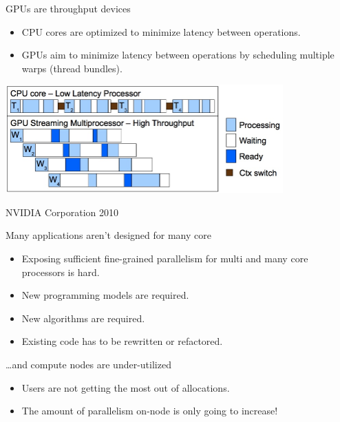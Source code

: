 \documentclass[aspectratio=43]{beamer}
\begin{document}
\begin{frame}[fragile]{GPUs are throughput devices}
    \begin{itemize}
        \item CPU cores are optimized to minimize latency between operations.
        \item GPUs aim to minimize latency between operations by scheduling multiple warps (thread bundles).
    \end{itemize}
    \begin{center}
        \includegraphics[width=0.8\textwidth]{./images/latency.jpg}
    \end{center}
    \footnotesize \textcopyright NVIDIA Corporation 2010
\end{frame}

\begin{frame}[fragile]{Many applications aren't designed for many core}
    \begin{itemize}
        \item Exposing sufficient fine-grained parallelism for multi and many core processors is hard.
        \item New programming models are required.
        \item New algorithms are required.
        \item Existing code has to be rewritten or refactored.
    \end{itemize}

    \begin{info}{\dots and compute nodes are under-utilized}
        \begin{itemize}
            \item Users are not getting the most out of allocations.
            \item The amount of parallelism on-node is only going to increase!
        \end{itemize}
    \end{info}
\end{frame}
\end{document}
